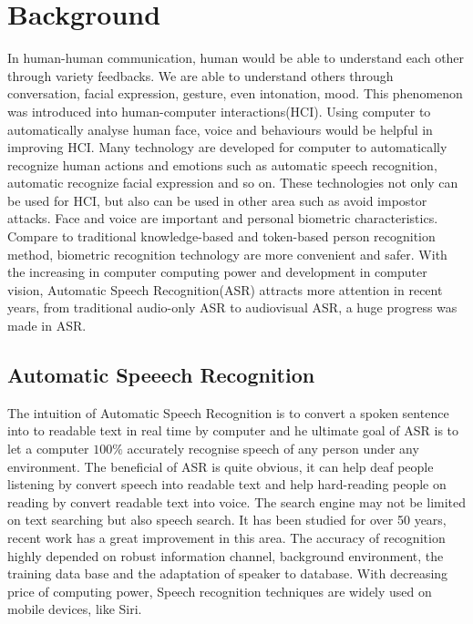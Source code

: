 \chapter{Background}
In human-human communication, human would be able to understand each other through variety feedbacks. We are able to understand others through conversation, facial expression, gesture, even intonation, mood. This phenomenon was introduced into human-computer interactions(HCI). Using computer to automatically analyse human face, voice and behaviours would be helpful in improving HCI. Many technology are developed for computer to automatically recognize human actions and emotions such as automatic speech recognition\cite{potamianos2003recent}, automatic recognize facial expression\cite{xiong2013supervised} and so on. These technologies not only can be used for HCI, but also can be used in other area such as avoid impostor attacks\cite{aleksic2006audio}.  Face and voice are important and personal biometric characteristics. Compare to traditional knowledge-based and token-based person recognition method, biometric recognition technology are more convenient and safer. With the increasing in computer computing power and development in computer vision, Automatic Speech Recognition(ASR) attracts more attention in recent years, from traditional audio-only ASR to audiovisual ASR, a huge progress was made in ASR.

\section{Automatic Speeech Recognition}
The intuition of Automatic Speech Recognition is to convert a spoken sentence into to readable text in real time by computer and he ultimate goal of ASR is to let a computer $100\%$ accurately recognise speech of any person under any environment. The beneficial of ASR is quite obvious, it can help deaf people listening by convert speech into readable text and help hard-reading people on reading by convert readable text into voice. The search engine may not be limited on text searching but also speech search. It has been studied for over 50 years, recent work has a great improvement in this area. The accuracy of recognition highly depended on robust information channel, background environment, the training data base and the adaptation of speaker to database. With decreasing price of computing power, Speech recognition techniques are widely used on mobile devices, like Siri.

